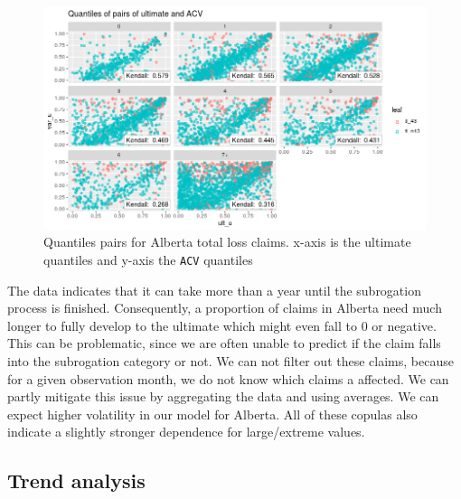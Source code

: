 	\begin{figure}[H]
		\begin{center}
			\includegraphics[scale=0.4]{Graphiques/ab_tl} 
			\renewcommand{\figurename}{Figure}
			\caption{Quantiles pairs for Alberta total loss claims. x-axis is the ultimate quantiles and y-axis the \texttt{ACV} quantiles}\label{Fig_copula_ab_tl}
		\end{center}
	\end{figure}

	The data indicates that it can take more than a year until the subrogation process is finished. Consequently, a proportion of claims in Alberta need much longer to fully develop to the ultimate which might even fall to 0 or negative. This can be problematic, since we are often unable to predict if the claim falls into the subrogation category or not. We can not filter out these claims, because for a given observation month, we do not know which claims a affected. We can partly mitigate this issue by aggregating the data and using averages. We can expect higher volatility in our model for Alberta. 
	All of these copulas also indicate a slightly stronger dependence for large/extreme values. 
	
	\subsection{Trend analysis}
	
